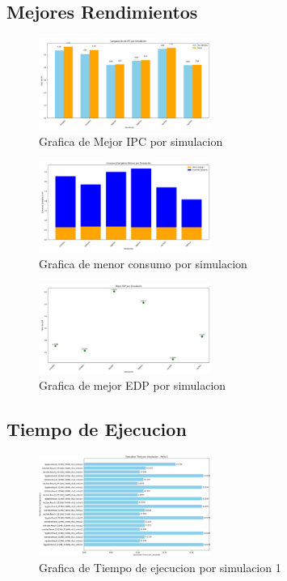 \documentclass[conference]{IEEEtran}
\begin{document}
\subsection{Mejores Rendimientos}
\begin{figure}[htbp]
\centering
\includegraphics[width=0.5\textwidth]{Mejor_IPC.png}
\caption{Grafica de Mejor IPC por simulacion}
\label{fig:example}
\end{figure}

\begin{figure}[htbp]
\centering
\includegraphics[width=0.5\textwidth]{Mejor_Energia.png}
\caption{Grafica de menor consumo por simulacion}
\label{fig:example}
\end{figure}

\begin{figure}[htbp]
\centering
\includegraphics[width=0.5\textwidth]{Mejor_EDP.png}
\caption{Grafica de mejor EDP por simulacion}
\label{fig:example}
\end{figure}
\newpage
\subsection{Tiempo de Ejecucion}
\begin{figure}[htbp]
\centering
\includegraphics[width=0.5\textwidth]{Tiempo_Ejecucion_1.png}
\caption{Grafica de Tiempo de ejecucion por simulacion 1}
\label{fig:example}
\end{figure}
\end{document}
